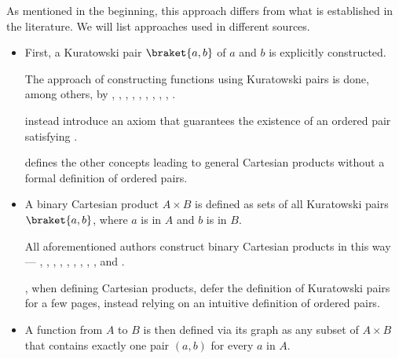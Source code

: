 \begin{remark}
  As mentioned in the beginning, this approach differs from what is established in the literature. We will list approaches used in different sources.
  \begin{itemize}
    \item First, a Kuratowski pair \( \braket{ a, b } \) of \( a \) and \( b \) is explicitly constructed.

    The approach of constructing functions using Kuratowski pairs is done, among others, by
    ,
    ,
    ,
    ,
    ,
    ,
    ,
    ,
    ,
    .

     instead introduce an axiom that guarantees the existence of an ordered pair satisfying .

     defines the other concepts leading to general Cartesian products without a formal definition of ordered pairs.

    \item A binary Cartesian product \( A \times B \) is defined as sets of all Kuratowski pairs \( \braket{ a, b } \), where \( a \) is in \( A \) and \( b \) is in \( B \).

    All aforementioned authors construct binary Cartesian products in this way ---
    ,
    ,
    ,
    ,
    ,
    ,
    ,
    ,
    ,
     and
    .

    , when defining Cartesian products, defer the definition of Kuratowski pairs for a few pages, instead relying on an intuitive definition of ordered pairs.

    \item A function from \( A \) to \( B \) is then defined via its graph as any subset of \( A \times B \) that contains exactly one pair \( (a, b) \) for every \( a \) in \( A \).


\end{itemize}
\end{remark}
